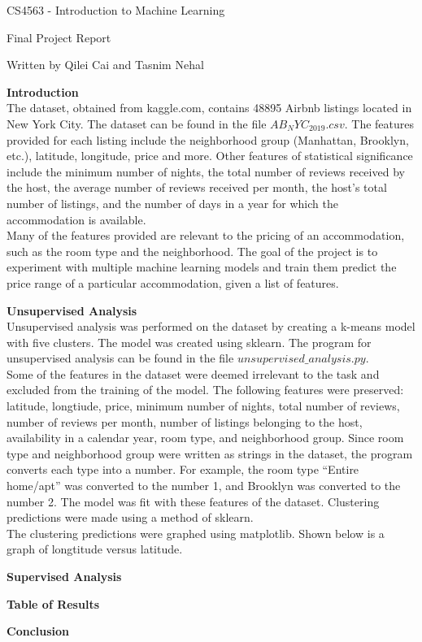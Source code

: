 \documentclass[12pt]{article}
\begin{document}
	\begin{center}
		CS4563 - Introduction to Machine Learning
	\end{center}

	\begin{center}
		Final Project Report
	\end{center}
	
	\begin{center} Written by Qilei Cai and Tasnim Nehal
	\end{center}
	
	\bigskip
	
	
	\textbf{Introduction}\\
	
	The dataset, obtained from kaggle.com, contains 48895 Airbnb listings located in New York City. The dataset can be found in the file $AB_NYC_2019.csv$. The features provided for each listing include the neighborhood group (Manhattan, Brooklyn, etc.), latitude, longitude, price and more. Other features of statistical significance include the minimum number of nights, the total number of reviews received by the host, the average number of reviews received per month, the host's total number of listings, and the number of days in a year for which the accommodation is available.\\
	
	Many of the features provided are relevant to the pricing of an accommodation, such as the room type and the neighborhood. The goal of the project is to experiment with multiple machine learning models and train them predict the price range of a particular accommodation, given a list of features.
	
	\bigskip
	
	\textbf{Unsupervised Analysis}\\
	
	Unsupervised analysis was performed on the dataset by creating a k-means model with five clusters. The model was created using sklearn. The program for unsupervised analysis can be found in the file $unsupervised\_analysis.py$.\\
	
	Some of the features in the dataset were deemed irrelevant to the task and excluded from the training of the model. The following features were preserved: latitude, longtiude, price, minimum number of nights, total number of reviews, number of reviews per month, number of listings belonging to the host, availability in a calendar year, room type, and neighborhood group. Since room type and neighborhood group were written as strings in the dataset, the program converts each type into a number. For example, the room type ``Entire home/apt'' was converted to the number 1, and Brooklyn was converted to the number 2. The model was fit with these features of the dataset. Clustering predictions were made using a method of sklearn.\\
	
	The clustering predictions were graphed using matplotlib. Shown below is a graph of longtitude versus latitude.
	
	\bigskip
	
	\textbf{Supervised Analysis}
	
	\bigskip
	
	\textbf{Table of Results}
	
	\bigskip
	
	\textbf{Conclusion}
\end{document}

